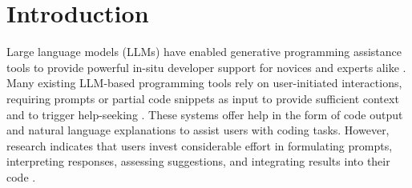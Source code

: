 \section{Introduction}

Large language models (LLMs) have enabled generative programming assistance tools to provide powerful in-situ developer support for novices and experts alike \cite{vaithilingam2022expectation, murillo2023exploreaccelerate, majeed2024novice, majeed2023intro, Khojah2024BeyondCG}.
Many existing LLM-based programming tools rely on user-initiated interactions, requiring prompts or partial code snippets as input to provide sufficient context and to trigger help-seeking \cite{vaithilingam2022expectation, Nam2023InIDEGI, Mcnutt2023OnTD, ross2023programmerassistant, jiang2022genline}.
These systems offer help in the form of code output and natural language explanations to assist users with coding tasks. 
However, research indicates that users invest considerable effort in formulating prompts, interpreting responses, assessing suggestions, and integrating results into their code \cite{Mozannar2022ReadingBT, vaithilingam2022expectation, jiang2022genline}. 

